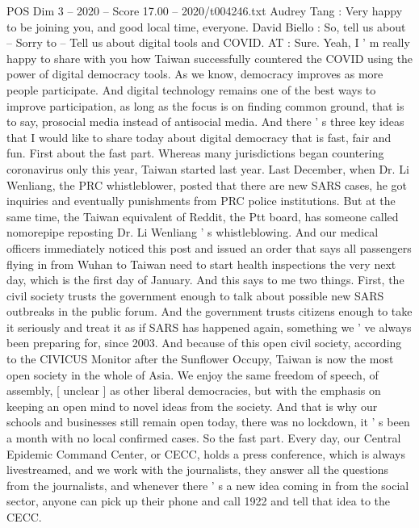 \begin{textsample}{POS Dim 3 – 2020 – Score 17.00 – 2020/t004246.txt}  \label{ex:f3_pos_016}
Audrey Tang : Very happy to be joining you, and good local time, everyone.
David Biello : So, tell us about -- Sorry to -- Tell us about digital tools and COVID.
AT : Sure.
Yeah, I ' m really happy to share with you how Taiwan successfully countered the COVID using the power of digital democracy tools.
As we know, democracy improves as more people participate.
And digital technology remains one of the best ways to improve participation, as long as the focus is on finding common ground, that is to say, prosocial media instead of antisocial media.
And there ' s three key ideas that I would like to share today about digital democracy that is fast, fair and fun.
First about the fast part.
Whereas many jurisdictions began countering coronavirus only this year, Taiwan started last year.
Last December, when Dr.
Li Wenliang, the PRC whistleblower, posted that there are new SARS cases, he got inquiries and eventually punishments from PRC police institutions.
But at the same time, the Taiwan equivalent of Reddit, the Ptt board, has someone called nomorepipe reposting Dr.
Li Wenliang ' s whistleblowing.
And our medical officers immediately noticed this post and issued an order that says all passengers flying in from Wuhan to Taiwan need to start health inspections the very next day, which is the first day of January.
And this says to me two things.
First, the civil society trusts the government enough to talk about possible new SARS outbreaks in the public forum.
And the government trusts citizens enough to take it seriously and treat it as if SARS has happened again, something we ' ve always been preparing for, since 2003.
And because of this open civil society, according to the CIVICUS Monitor after the Sunflower Occupy, Taiwan is now the most open society in the whole of Asia.
We enjoy the same freedom of speech, of assembly, [ unclear ] as other liberal democracies, but with the emphasis on keeping an open mind to novel ideas from the society.
And that is why our schools and businesses still remain open today, there was no lockdown, it ' s been a month with no local confirmed cases.
So the fast part.
Every day, our Central Epidemic Command Center, or CECC, holds a press conference, which is always livestreamed, and we work with the journalists, they answer all the questions from the journalists, and whenever there ' s a new idea coming in from the social sector, anyone can pick up their phone and call 1922 and tell that idea to the CECC.

\end{textsample}
